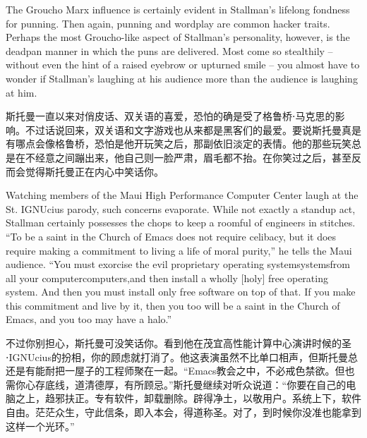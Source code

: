 \ifdefined\eng
The Groucho Marx influence is certainly evident in Stallman's lifelong fondness for punning. Then again, punning and wordplay are common hacker traits. Perhaps the most Groucho-like aspect of Stallman's personality, however, is the deadpan manner in which the puns are delivered. Most come so stealthily -- without even the hint of a raised eyebrow or upturned smile -- you almost have to wonder if Stallman's laughing at his audience more than the audience is laughing at him.
\fi

\ifdefined\chs
斯托曼一直以来对俏皮话、双关语的喜爱，恐怕的确是受了格鲁桥⋅马克思的影响。不过话说回来，双关语和文字游戏也从来都是黑客们的最爱。要说斯托曼真是有哪点会像格鲁桥，恐怕是他开玩笑之后，那副依旧淡定的表情。他的那些玩笑总是在不经意之间蹦出来，他自己则一脸严肃，眉毛都不抬。在你笑过之后，甚至反而会觉得斯托曼正在内心中笑话你。
\fi

\ifdefined\eng
Watching members of the Maui High Performance Computer Center laugh at the St. IGNUcius parody, such concerns evaporate. While not exactly a standup act, Stallman certainly possesses the chops to keep a roomful of engineers in stitches. ``To be a saint in the Church of Emacs does not require celibacy, but it does require making a commitment to living a life of moral purity,'' he tells the Maui audience. ``You must exorcise the evil proprietary operating \ifdefined\vone system\fi\ifdefined\vtwo systems\fi from all your \ifdefined\vone computer\fi\ifdefined\vtwo computers,\fi and then install a wholly [holy] free operating system. And then you must install only free software on top of that. If you make this commitment and live by it, then you too will be a saint in the Church of Emacs, and you too may have a halo.''
\fi

\ifdefined\chs
不过你别担心，斯托曼可没笑话你。看到他在茂宜高性能计算中心演讲时候的圣⋅IGNUcius的扮相，你的顾虑就打消了。他这表演虽然不比单口相声，但斯托曼总还是有能耐把一屋子的工程师聚在一起。``Emacs教会之中，不必戒色禁欲。但也需你心存底线，道清德厚，有所顾忌。''斯托曼继续对听众说道：``你要在自己的电脑之上，趋邪扶正。专有软件，卸载删除。辟得净土，以敬用户。系统上下，软件自由。茫茫众生，守此信条，即入本会，得道称圣。对了，到时候你没准也能拿到这样一个光环。''
\fi

